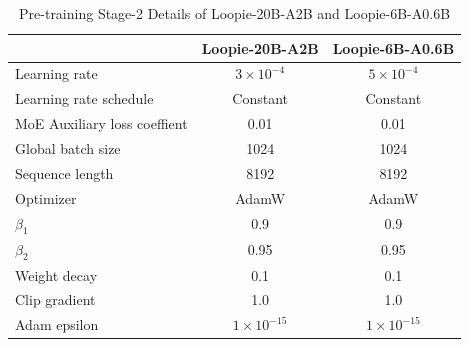\newpage
\begin{table}[!hbp]
\centering
\caption{Pre-training Stage-2 Details of Loopie-20B-A2B and Loopie-6B-A0.6B}
\vspace{2pt}
{\small
\setlength{\tabcolsep}{20pt}
\renewcommand{\arraystretch}{1.5}
\begin{tabular}{l|cc}
\toprule
 & Loopie-20B-A2B & Loopie-6B-A0.6B  \\
\midrule
Learning rate & $3\times10^{-4}$  & $5\times10^{-4}$  \\
Learning rate schedule & Constant & Constant  \\
MoE Auxiliary loss coeffient & 0.01 & 0.01 \\
Global batch size & 1024  & 1024 \\
Sequence length & 8192  & 8192 \\
Optimizer & AdamW  & AdamW \\
$\beta_1$ & 0.9 & 0.9  \\
$\beta_2$ & 0.95 & 0.95 \\
Weight decay & 0.1  & 0.1 \\
Clip gradient & 1.0  & 1.0 \\
Adam epsilon & $1\times10^{-15}$ & $1\times10^{-15}$ \\
\bottomrule
\end{tabular}
}
\label{tab:pretrain-stage2-details}
\end{table}


\vspace{20mm}
\label{app:scaling-ladder}

